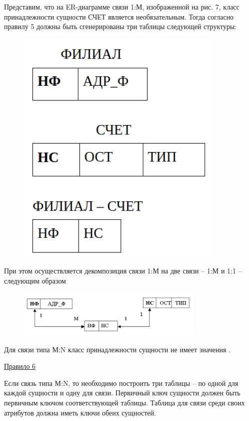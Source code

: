\begin{enumerate}
    Представим, что на ER-диаграмме связи 1:М, изображенной на рис. 7, класс принадлежности сущности СЧЕТ
    является необязательным. Тогда согласно правилу 5 должны быть сгенерированы три таблицы следующей структуры:

    \begin{figure}[H]
        \centering
        \includegraphics[width=100mm]{assets/security/pic11.png}
        \label{fig:mesh13}
    \end{figure}

    При этом осуществляется декомпозиция связи 1:М на две связи – 1:М и 1:1 – следующим образом

    \begin{figure}[H]
        \centering
        \includegraphics[width=0.8\textwidth]{assets/security/pic12.png}
        \label{fig:mesh14}
    \end{figure}

    Для связи типа М:N класс принадлежности сущности не имеет значения \autocite{design_db_4}.

    \underline{Правило 6}

    Если связь типа М:N, то необходимо построить три таблицы – по одной для каждой сущности и одну для связи.
    Первичный ключ сущности должен быть первичным ключом соответствующей таблицы. Таблица для связи среди своих
    атрибутов должна иметь ключи обеих сущностей.


\end{enumerate}
